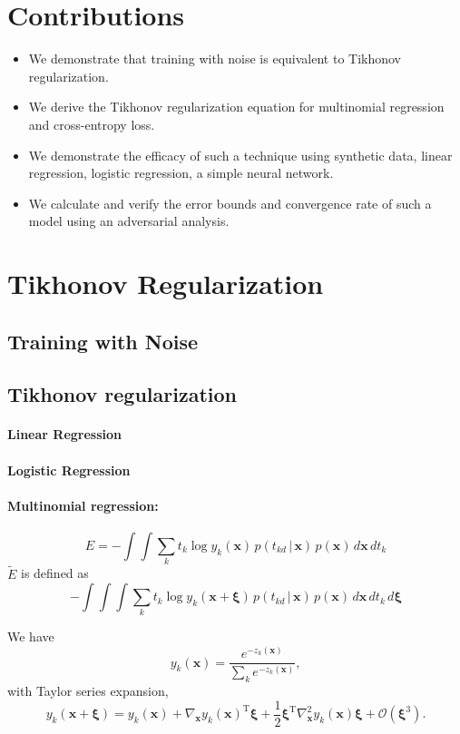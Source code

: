 \documentclass[conference]{IEEEtran}
\renewcommand{\v}[1]{\boldsymbol{#1}}
\newcommand{\dep}{\,|\,}
\newcommand{\T}{\mathrm{T}}
\begin{document}
\section{Contributions}
\begin{itemize}
    \item We demonstrate that training with noise is equivalent to Tikhonov regularization. 
    \item We derive the Tikhonov regularization equation for multinomial regression and cross-entropy loss. 
    \item We demonstrate the efficacy of such a technique using synthetic data, linear regression, logistic regression, a simple neural network.
    \item We calculate and verify the error bounds and convergence rate of such a model using an adversarial analysis.
\end{itemize}

\section{Tikhonov Regularization}

\subsection{Training with Noise}

\subsection{Tikhonov regularization}
\paragraph{Linear Regression}
\paragraph{Logistic Regression}
\paragraph{Multinomial regression:}


$$
    E = -\int\int\sum_k t_{k} \log y_{k}(\v{x}) \, p(t_{kd} \dep \v{x})\, p(\v{x})\, d\v{x}\, dt_k
$$
$\widetilde{E} $ is defined as
$$
    -\int\int\int\sum_k t_{k} \log y_{k}(\v{x} + \v{\xi}) \, p(t_{kd} \dep \v{x})\, p(\v{x})\, d\v{x}\, dt_k\, d\v{\xi}
$$

We have
$$
    y_{k}(\v{x}) = \frac{e^{-z_k(\v{x})}}{\sum_k e^{-z_k(\v{x})}},
$$
with Taylor series expansion,
$$
    y_k(\v{x} + \v{\xi}) = y_k(\v{x})
                             + \nabla_{\v{x}}y_k(\v{x})^\T\v{\xi}
                             + \frac{1}{2}\v{\xi}^\T\nabla^2_{\v{x}}y_k(\v{x})\v{\xi}
                             + \mathcal{O}(\v{\xi}^3).
$$
\end{document}
